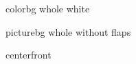 \documentclass[
    coverwidth=213mm, %
    coverheight=303mm, %
    spinewidth=17.8mm, %
    bleedwidth=3mm,
    12pt,
    trimmed=false
    ]{bookcover}
\begin{document}
\begin{bookcover}


\begin{bookcoverelement}{color}{bg whole}
    white
\end{bookcoverelement}

\begin{bookcoverelement}{picture}{bg whole without flaps}
\end{bookcoverelement}



\begin{bookcoverelement}{center}{front}
\end{bookcoverelement}


\end{bookcover}
\end{document}
